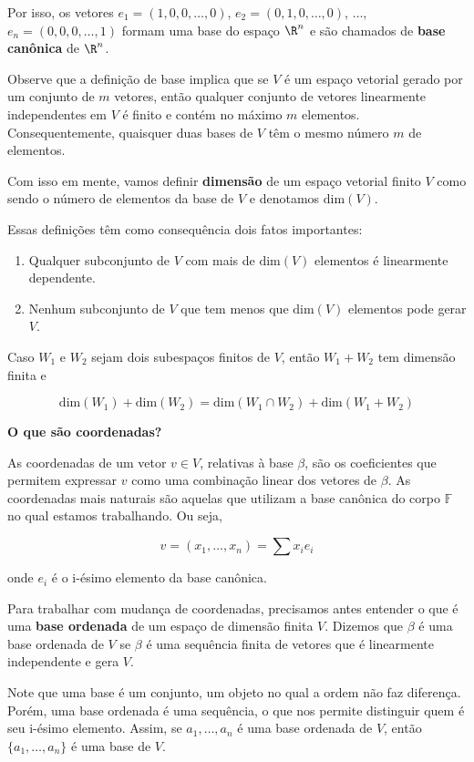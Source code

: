 \documentclass[
]{article}
\begin{document}
Por isso, os vetores \(e_1 = (1,0,0,\ldots,0)\),
\(e_2 = (0,1,0,\ldots,0)\), \(\ldots\), \(e_n = (0,0,0,\ldots,1)\)
formam uma base do espaço \(\R^n\) e são chamados de \textbf{base
canônica} de \(\R^n\).

Observe que a definição de base implica que se \(V\) é um espaço
vetorial gerado por um conjunto de \(m\) vetores, então qualquer
conjunto de vetores linearmente independentes em \(V\) é finito e contém
no máximo \(m\) elementos. Consequentemente, quaisquer duas bases de
\(V\) têm o mesmo número \(m\) de elementos.

Com isso em mente, vamos definir \textbf{dimensão} de um espaço vetorial
finito \(V\) como sendo o número de elementos da base de \(V\) e
denotamos \(\text{dim}(V)\).

Essas definições têm como consequência dois fatos importantes:

\begin{enumerate}
\def\labelenumi{\arabic{enumi}.}
\item
  Qualquer subconjunto de \(V\) com mais de \(\text{dim}(V)\) elementos
  é linearmente dependente.
\item
  Nenhum subconjunto de \(V\) que tem menos que \(\text{dim}(V)\)
  elementos pode gerar \(V\).
\end{enumerate}

Caso \(W_1\) e \(W_2\) sejam dois subespaços finitos de \(V\), então
\(W_1 + W_2\) tem dimensão finita e

\[\text{dim}(W_1) + \text{dim}(W_2) = \text{dim}(W_1 \cap W_2) + \text{dim}(W_1 + W_2)\]

\textbf{O que são coordenadas?}

As coordenadas de um vetor \(v \in V\), relativas à base \(\beta\), são
os coeficientes que permitem expressar \(v\) como uma combinação linear
dos vetores de \(\beta\). As coordenadas mais naturais são aquelas que
utilizam a base canônica do corpo \(\mathbb{F}\) no qual estamos
trabalhando. Ou seja,

\[v = (x_1, \ldots, x_n) = \sum x_i e_i\]

onde \(e_i\) é o i-ésimo elemento da base canônica.

Para trabalhar com mudança de coordenadas, precisamos antes entender o
que é uma \textbf{base ordenada} de um espaço de dimensão finita \(V\).
Dizemos que \(\beta\) é uma base ordenada de \(V\) se \(\beta\) é uma
sequência finita de vetores que é linearmente independente e gera \(V\).

Note que uma base é um conjunto, um objeto no qual a ordem não faz
diferença. Porém, uma base ordenada é uma sequência, o que nos permite
distinguir quem é seu i-ésimo elemento. Assim, se \(a_1, \ldots, a_n\) é
uma base ordenada de \(V\), então \(\{ a_1, \ldots, a_n \}\) é uma base
de \(V\).
\end{document}
